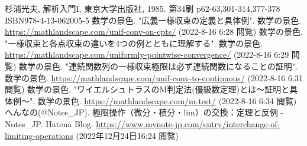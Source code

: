 \documentclass[dvipdfmx]{jsarticle}
\begin{document}
\begin{thebibliography}{50}
  杉浦光夫, 解析入門I, 東京大学出版社, 1985. 第34刷 p62-63,301-314,377-378 ISBN978-4-13-062005-5
  数学の景色. "広義一様収束の定義と具体例". 数学の景色. \url{https://mathlandscape.com/unif-conv-on-cpts/} (2022-8-16 6:28 閲覧)
  数学の景色. "一様収束と各点収束の違いを4つの例とともに理解する". 数学の景色. \url{https://mathlandscape.com/uniformly-pointwise-convergence/} (2022-8-16 6:29 閲覧)
  数学の景色. "連続関数列の一様収束極限は必ず連続関数になることの証明". 数学の景色. \url{https://mathlandscape.com/unif-conv-to-continuous/} (2022-8-16 6:31 閲覧)
  数学の景色. "ワイエルシュトラスのM判定法(優級数定理)とは～証明と具体例～". 数学の景色. \url{https://mathlandscape.com/m-test/} (2022-8-16 6:34 閲覧)
  へんなの(@Notes\_JP). 極限操作（微分・積分・lim）の交換：定理と反例 - Notes\_JP. Hatena Blog. \url{https://www.mynote-jp.com/entry/interchange-of-limiting-operations} (2022年12月24日16:24 閲覧)
\end{thebibliography}
\end{document}
